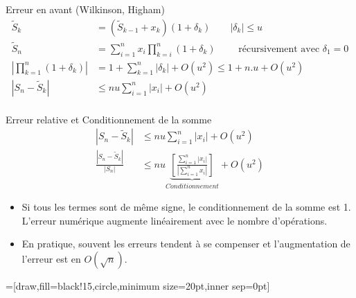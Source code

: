 \documentclass{beamer}
\begin{document}
\begin{frame}{Erreur en avant (Wilkinson, Higham)}
    \begin{align*}
        \widetilde{S}_k                            & = (\widetilde{S}_{k-1}+x_k)(1+\delta_k) \qquad |\delta_k| \le u                                 \\
        \widetilde{S}_n                            & = \sum_{i=1}^n x_i \prod_{k=i}^{n}(1+\delta_k) \qquad \text { récursivement avec } \delta_1 = 0 \\
        \left| \prod_{k=1}^n{(1+\delta_k)} \right| & = 1 + \sum_{k=1}^n{|\delta_k|} + O(u^2) \le 1 + n.u + O(u^2)                                    \\
        \left|S_n - \widetilde{S}_k \right|        & \le nu\sum_{i=1}^n{|x_i|} + O(u^2)                                                              \\
    \end{align*}
\end{frame}

\begin{frame}{Erreur relative et Conditionnement de la somme}
    \begin{align*}
        \left|S_n - \widetilde{S}_k \right|               & \le nu\sum_{i=1}^n{|x_i|} + O(u^2)                                                                                           \\
        \frac{\left|S_n - \widetilde{S}_k \right|}{|S_n|} & \le   nu \underbrace{\left[\frac{\sum_{i=1}^n{|x_i|}}{ \left|\sum_{i=1}^n{x_i} \right|} \right]}_{Conditionnement}  + O(u^2)
    \end{align*}

    \begin{itemize}
        \item Si tous les termes sont de même signe, le conditionnement de la somme est 1.
              L'erreur numérique augmente linéairement avec le nombre d'opérations.
        \item En pratique, souvent les erreurs tendent à se compenser et l'augmentation de l'erreur est en $O(\sqrt{n})$.
    \end{itemize}
\end{frame}

=[draw,fill=black!15,circle,minimum size=20pt,inner sep=0pt]
\end{document}
